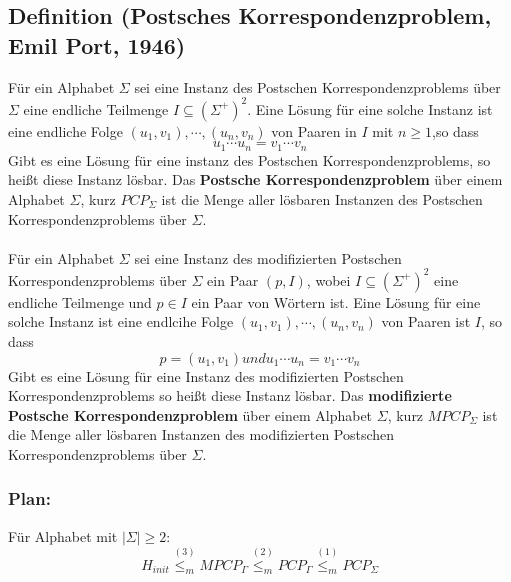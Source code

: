 \begin{center}
        
  \end{center}

  \subsection{Definition (Postsches Korrespondenzproblem, Emil Port, 1946)} Für ein Alphabet $\Sigma$ sei eine Instanz des Postschen Korrespondenzproblems über $\Sigma$ eine endliche Teilmenge $I \subseteq (\Sigma^+)^2$. Eine Lösung für eine solche Instanz ist eine endliche Folge $(u_1, v_1), \cdots, (u_n, v_n)$ von Paaren in $I$ mit $n \geq 1$,so dass \[u_1 \cdots u_n = v_1 \cdots v_n\] Gibt es eine Lösung für eine instanz des Postschen Korrespondenzproblems, so heißt diese Instanz lösbar. Das \textbf{Postsche Korrespondenzproblem} über einem Alphabet $\Sigma$, kurz $PCP_{\Sigma}$ ist die Menge aller lösbaren Instanzen des Postschen Korrespondenzproblems über $\Sigma$.\\\\ Für ein Alphabet $\Sigma$ sei eine Instanz des modifizierten Postschen Korrespondenzproblems über $\Sigma$ ein Paar $(p, I)$, wobei $I\subseteq (\Sigma^+)^2$ eine endliche Teilmenge und $p\in I$ ein Paar von Wörtern ist. Eine Lösung für eine solche Instanz ist eine endlcihe Folge $(u_1, v_1), \cdots, (u_n, v_n)$ von Paaren ist $I$, so dass \[p = (u_1, v_1) und u_1\cdots u_n = v_1\cdots v_n\] Gibt es eine Lösung für eine Instanz des modifizierten Postschen Korrespondenzproblems so heißt diese Instanz lösbar. Das \textbf{modifizierte Postsche Korrespondenzproblem} über einem Alphabet $\Sigma$, kurz $MPCP_{\Sigma}$ ist die Menge aller lösbaren Instanzen des modifizierten Postschen Korrespondenzproblems über $\Sigma$.
  \subsubsection*{Plan: } Für Alphabet mit $|\Sigma| \geq 2$: \[H_{init} \stackrel{(3)}{\leq_m} MPCP_{\Gamma} \stackrel{(2)}{\leq_m} PCP_{\Gamma} \stackrel{(1)}{\leq_m} PCP_{\Sigma}\]
